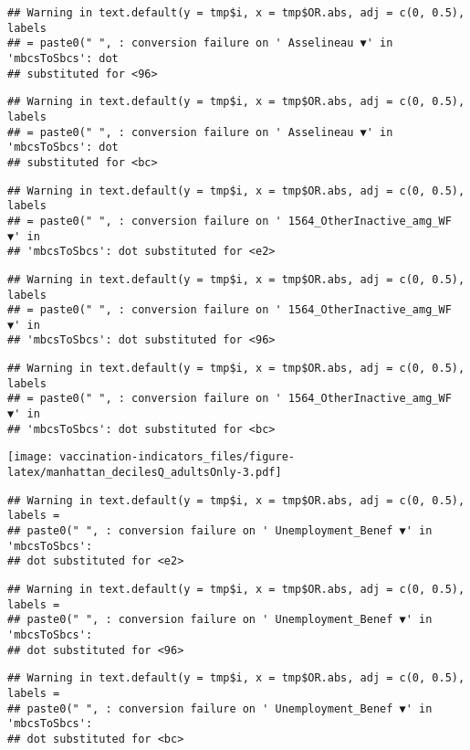\documentclass[
]{article}
\begin{document}
\begin{verbatim}
## Warning in text.default(y = tmp$i, x = tmp$OR.abs, adj = c(0, 0.5), labels
## = paste0(" ", : conversion failure on ' Asselineau ▼' in 'mbcsToSbcs': dot
## substituted for <96>
\end{verbatim}

\begin{verbatim}
## Warning in text.default(y = tmp$i, x = tmp$OR.abs, adj = c(0, 0.5), labels
## = paste0(" ", : conversion failure on ' Asselineau ▼' in 'mbcsToSbcs': dot
## substituted for <bc>
\end{verbatim}

\begin{verbatim}
## Warning in text.default(y = tmp$i, x = tmp$OR.abs, adj = c(0, 0.5), labels
## = paste0(" ", : conversion failure on ' 1564_OtherInactive_amg_WF ▼' in
## 'mbcsToSbcs': dot substituted for <e2>
\end{verbatim}

\begin{verbatim}
## Warning in text.default(y = tmp$i, x = tmp$OR.abs, adj = c(0, 0.5), labels
## = paste0(" ", : conversion failure on ' 1564_OtherInactive_amg_WF ▼' in
## 'mbcsToSbcs': dot substituted for <96>
\end{verbatim}

\begin{verbatim}
## Warning in text.default(y = tmp$i, x = tmp$OR.abs, adj = c(0, 0.5), labels
## = paste0(" ", : conversion failure on ' 1564_OtherInactive_amg_WF ▼' in
## 'mbcsToSbcs': dot substituted for <bc>
\end{verbatim}

\texttt{[image: vaccination-indicators\_files/figure-latex/manhattan\_decilesQ\_adultsOnly-3.pdf]}

\begin{verbatim}
## Warning in text.default(y = tmp$i, x = tmp$OR.abs, adj = c(0, 0.5), labels =
## paste0(" ", : conversion failure on ' Unemployment_Benef ▼' in 'mbcsToSbcs':
## dot substituted for <e2>
\end{verbatim}

\begin{verbatim}
## Warning in text.default(y = tmp$i, x = tmp$OR.abs, adj = c(0, 0.5), labels =
## paste0(" ", : conversion failure on ' Unemployment_Benef ▼' in 'mbcsToSbcs':
## dot substituted for <96>
\end{verbatim}

\begin{verbatim}
## Warning in text.default(y = tmp$i, x = tmp$OR.abs, adj = c(0, 0.5), labels =
## paste0(" ", : conversion failure on ' Unemployment_Benef ▼' in 'mbcsToSbcs':
## dot substituted for <bc>
\end{verbatim}
\end{document}
